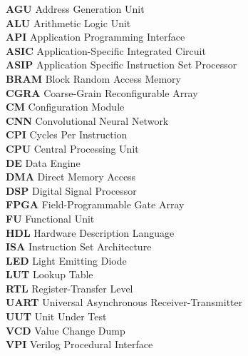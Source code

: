 	
	\noindent
	\textbf{AGU} Address Generation Unit\\
	\textbf{ALU} Arithmetic Logic Unit\\
	\textbf{API} Application Programming Interface\\
	\textbf{ASIC} Application-Specific Integrated Circuit\\
	\textbf{ASIP} Application Specific Instruction Set Processor\\
	\textbf{BRAM} Block Random Access Memory\\
	\textbf{CGRA} Coarse-Grain Reconfigurable Array\\
	\textbf{CM} Configuration Module\\
	\textbf{CNN} Convolutional Neural Network\\
	\textbf{CPI} Cycles Per Instruction\\
	\textbf{CPU} Central Processing Unit\\
	\textbf{DE} Data Engine\\
	\textbf{DMA} Direct Memory Access\\
	\textbf{DSP} Digital Signal Processor\\
	\textbf{FPGA} Field-Programmable Gate Array\\
	\textbf{FU} Functional Unit\\
	\textbf{HDL} Hardware Description Language\\
	\textbf{ISA} Instruction Set Architecture\\
	\textbf{LED} Light Emitting Diode\\
	\textbf{LUT} Lookup Table\\
	\textbf{RTL} Register-Transfer Level\\
	\textbf{UART} Universal Asynchronous Receiver-Transmitter\\
	\textbf{UUT} Unit Under Test\\
	\textbf{VCD} Value Change Dump\\
	\textbf{VPI} Verilog Procedural Interface\\